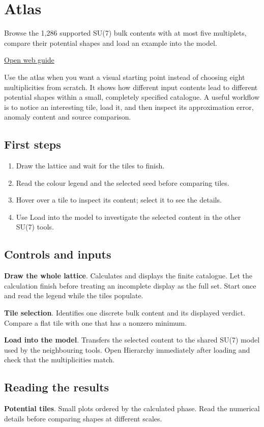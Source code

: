 \documentclass[11pt,a4paper]{article}
\begin{document}
\section{Atlas}
Browse the 1,286 supported SU(7) bulk contents with at most five multiplets, compare their potential shapes and load an example into the model.

\href{https://karlesmarin.github.io/ghu-explorer/guide/atlas7/index.html}{Open web guide}

Use the atlas when you want a visual starting point instead of choosing eight multiplicities from scratch. It shows how different input contents lead to different potential shapes within a small, completely specified catalogue. A useful workflow is to notice an interesting tile, load it, and then inspect its approximation error, anomaly content and source comparison.
\subsection*{First steps}
\begin{enumerate}
\item Draw the lattice and wait for the tiles to finish.
\item Read the colour legend and the selected seed before comparing tiles.
\item Hover over a tile to inspect its content; select it to see the details.
\item Use Load into the model to investigate the selected content in the other SU(7) tools.
\end{enumerate}
\subsection*{Controls and inputs}
\textbf{Draw the whole lattice}. Calculates and displays the finite catalogue. Let the calculation finish before treating an incomplete display as the full set. Start once and read the legend while the tiles populate.

\textbf{Tile selection}. Identifies one discrete bulk content and its displayed verdict. Compare a flat tile with one that has a nonzero minimum.

\textbf{Load into the model}. Transfers the selected content to the shared SU(7) model used by the neighbouring tools. Open Hierarchy immediately after loading and check that the multiplicities match.

\subsection*{Reading the results}
\textbf{Potential tiles}. Small plots ordered by the calculated phase. Read the numerical details before comparing shapes at different scales.
\end{document}
